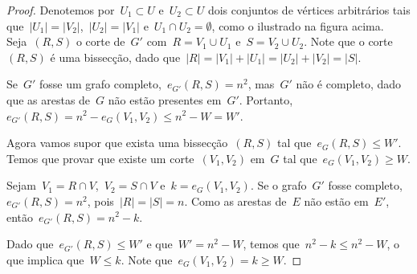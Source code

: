 \begin{proof}
		Denotemos por~${U_1\subset U}$ e~${U_2\subset U}$ dois conjuntos de vértices
		arbitrários
		tais que~${|U_1| = |V_2|}$,~${|U_2| = |V_1|}$ e~$U_1\cap U_2 = \emptyset$,
		como o ilustrado na figura acima.
		Seja~$(R,S)$ o corte de~$G'$ com~${R=V_1\cup U_1}$
		e~${S=V_2\cup U_2}$. 
		Note que o corte~$(R,S)$ é uma bissecção, dado 
		que~${|R| = |V_1| + |U_1| = |U_2|+|V_2| = |S|}$.

		Se~$G'$ fosse um grafo completo,~$e_{G'}(R,S) = n^2$,
		mas~$G'$ não é completo, dado que as arestas 
		de~$G$ não estão presentes em~$G'$.
		Portanto,~${e_{G'}(R,S) = n^2 - e_G(V_1,V_2)\le n^2-W = W'}$.


		\bigskip

		Agora vamos supor que 
		exista uma bissecção~$(R,S)$ tal que~${e_G(R,S)\le W'}$.
		Temos que provar que existe um corte~$(V_1,V_2)$ em~$G$ tal 
		que~${e_G(V_1,V_2)\ge W}$.

		Sejam~${V_1 = R\cap V}$,~${V_2 = S\cap V}$
		e~${k = e_G(V_1,V_2)}$. 
		Se o grafo~$G'$ fosse completo,~${e_{G'}(R,S) = n^2}$,
		pois~${|R| = |S| = n}$.
		Como as arestas de~$E$ não estão em~$E'$,
		então~${e_{G'}(R, S) = n^2 - k}$.

		Dado que~$e_{G'}(R,S)\le W'$ e que~$W'= n^2-W$, 
		temos que~$n^2-k \le n^2 -W$,
		o que implica que~$W\le k$.
		Note que~$e_G(V_1,V_2) = k \ge W$.
	\end{proof}

\bigskip
\bigskip
